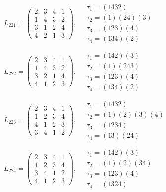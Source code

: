 $L_{221} = \begin{pmatrix} 2 & 3 & 4 & 1 \\ 1 & 4 & 3 & 2 \\ 3 & 1 & 2 & 4 \\ 4 & 2 & 1 & 3 \end{pmatrix}, \quad \begin{matrix} \tau_{1} = (1 4 3 2) \\ \tau_{2} = (1)(2 4)(3) \\ \tau_{3} = (1 2 3)(4) \\ \tau_{4} = (1 3 4)(2) \end{matrix}$

$L_{222} = \begin{pmatrix} 2 & 3 & 4 & 1 \\ 1 & 4 & 3 & 2 \\ 3 & 2 & 1 & 4 \\ 4 & 1 & 2 & 3 \end{pmatrix}, \quad \begin{matrix} \tau_{1} = (1 4 2)(3) \\ \tau_{2} = (1)(2 4 3) \\ \tau_{3} = (1 2 3)(4) \\ \tau_{4} = (1 3 4)(2) \end{matrix}$

$L_{223} = \begin{pmatrix} 2 & 3 & 4 & 1 \\ 1 & 2 & 3 & 4 \\ 4 & 1 & 2 & 3 \\ 3 & 4 & 1 & 2 \end{pmatrix}, \quad \begin{matrix} \tau_{1} = (1 4 3 2) \\ \tau_{2} = (1)(2)(3)(4) \\ \tau_{3} = (1 2 3 4) \\ \tau_{4} = (1 3)(2 4) \end{matrix}$

$L_{224} = \begin{pmatrix} 2 & 3 & 4 & 1 \\ 1 & 2 & 3 & 4 \\ 3 & 4 & 1 & 2 \\ 4 & 1 & 2 & 3 \end{pmatrix}, \quad \begin{matrix} \tau_{1} = (1 4 2)(3) \\ \tau_{2} = (1)(2)(3 4) \\ \tau_{3} = (1 2 3)(4) \\ \tau_{4} = (1 3 2 4) \end{matrix}$

